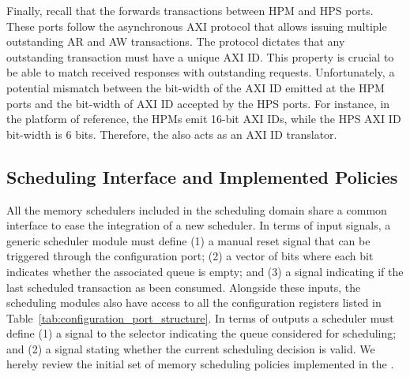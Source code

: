 Finally, recall that the \schim forwards transactions between HPM and
HPS ports. These ports follow the asynchronous AXI protocol that
allows issuing multiple outstanding AR and AW transactions. The
protocol dictates that any outstanding transaction must have a unique
AXI ID. This property is crucial to be able to match received
responses with outstanding requests. Unfortunately,
a potential mismatch between the bit-width of the AXI ID emitted at the HPM
ports and the bit-width of AXI ID accepted by the HPS ports. For
instance, in the platform of reference, the HPMs emit 16-bit AXI IDs,
while the HPS AXI ID bit-width is 6 bits. Therefore, the \schim also
acts as an AXI ID translator.




\subsection{Scheduling Interface and Implemented Policies}\label{sec:sched_interf}
All the memory schedulers included in the scheduling domain share a
common interface to ease the integration of a new scheduler. In terms
of input signals, a generic scheduler module must define (1) a manual
reset signal that can be triggered through the configuration port; (2)
a vector of bits where each bit indicates whether the associated queue
is empty; and (3) a signal indicating if the last scheduled
transaction as been consumed. Alongside these inputs, the scheduling
modules also have access to all the configuration registers listed in
Table~\ref{tab:configuration_port_structure}. In terms of outputs a
\schim scheduler must define (1) a signal to the selector indicating
the queue considered for scheduling; and (2) a signal stating whether
the current scheduling decision is valid. We hereby review the initial
set of memory scheduling policies implemented in the \schim.

